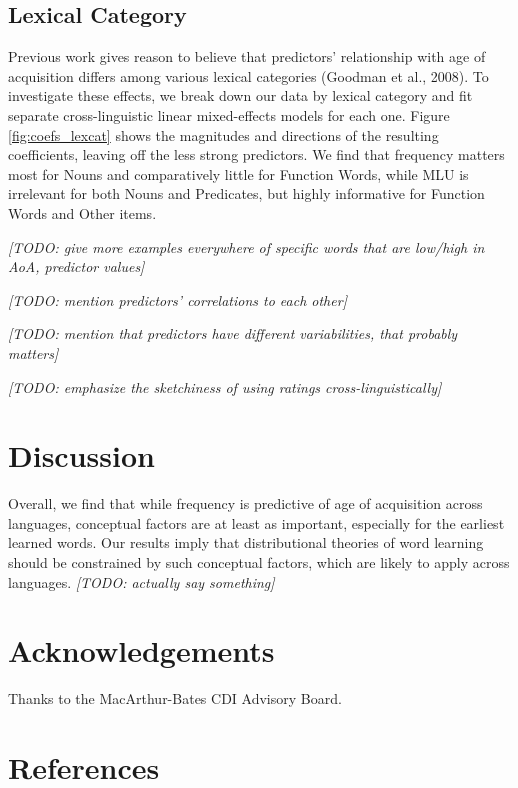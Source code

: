 \documentclass[10pt, letterpaper]{article}
\begin{document}
\subsection{Lexical Category}\label{lexical-category}

Previous work gives reason to believe that predictors' relationship with
age of acquisition differs among various lexical categories (Goodman et
al., 2008). To investigate these effects, we break down our data by
lexical category and fit separate cross-linguistic linear mixed-effects
models for each one. Figure \ref{fig:coefs_lexcat} shows the magnitudes
and directions of the resulting coefficients, leaving off the less
strong predictors. We find that frequency matters most for Nouns and
comparatively little for Function Words, while MLU is irrelevant for
both Nouns and Predicates, but highly informative for Function Words and
Other items.

\emph{{[}TODO: give more examples everywhere of specific words that are
low/high in AoA, predictor values{]}}

\emph{{[}TODO: mention predictors' correlations to each other{]}}

\emph{{[}TODO: mention that predictors have different variabilities,
that probably matters{]}}

\emph{{[}TODO: emphasize the sketchiness of using ratings
cross-linguistically{]}}

\newpage

\section{Discussion}\label{discussion}

Overall, we find that while frequency is predictive of age of
acquisition across languages, conceptual factors are at least as
important, especially for the earliest learned words. Our results imply
that distributional theories of word learning should be constrained by
such conceptual factors, which are likely to apply across languages.
\emph{{[}TODO: actually say something{]}}

\section{Acknowledgements}\label{acknowledgements}

Thanks to the MacArthur-Bates CDI Advisory Board.

\section{References}\label{references}
\end{document}
